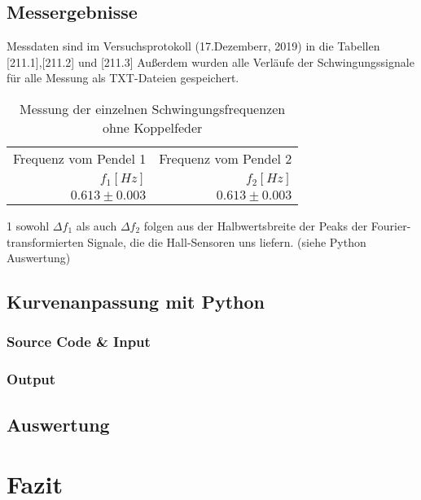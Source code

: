 \documentclass[a4paper,10pt]{article}
\begin{document}
\subsection{Messergebnisse}
Messdaten sind im Versuchsprotokoll (17.Dezemberr, 2019) in die Tabellen [211.1],[211.2] und [211.3]
Außerdem wurden alle Verläufe der Schwingungssignale für alle Messung als TXT-Dateien gespeichert.

\unboldmath
\begin{table}[htb]
\centering
\caption{Messung der einzelnen Schwingungsfrequenzen ohne Koppelfeder}\label{tab:Tab1}
\begin{threeparttable}
\begin{tabular}{rr}
\toprule
Frequenz vom Pendel 1  & Frequenz vom Pendel 2\\
\boldmath\(f_1\)\unboldmath\([Hz]\)&\boldmath\(f_2\)\unboldmath\([Hz]\)\\
\midrule
\(0.613\pm0.003\)&\(0.613\pm0.003\)\\
  \bottomrule
 \end{tabular}
\begin{tablenotes}
\raggedright
\item[1]sowohl \boldmath\(\Delta f_1\) als auch \(\Delta f_2\) folgen aus der Halbwertsbreite der Peaks der Fourier-transformierten Signale, die die Hall-Sensoren uns liefern. (siehe Python Auswertung) \unboldmath
\end{tablenotes}
\end{threeparttable}\end{table}
\boldmath

\subsection{Kurvenanpassung mit Python}
\subsubsection{Source Code \& Input}

\subsubsection{Output}

\subsection{Auswertung}

\section{Fazit}

\unboldmath
\end{document}

